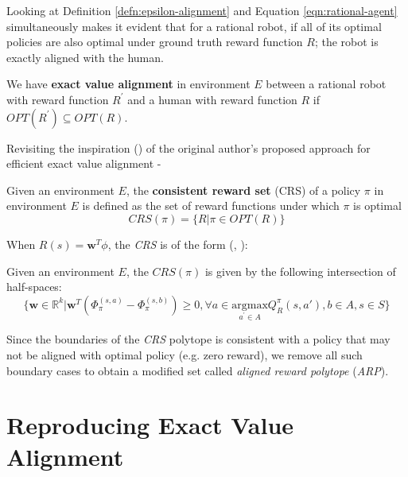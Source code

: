 Looking at Definition \ref{defn:epsilon-alignment} and Equation \ref{eqn:rational-agent} simultaneously makes it evident that for a rational robot, if all of its optimal policies are also optimal under ground truth reward function $R$; the robot is exactly aligned with the human.
\begin{corollary}
    We have \textbf{exact value alignment} in environment $E$ between a rational robot with  reward function $R^{'}$ and a human with reward function $R$ if $OPT(R^{'}) \subseteq OPT(R)$.
\end{corollary}
Revisiting the inspiration (\cite{ng2000algorithms}) of the original author's proposed approach for efficient exact value alignment - 
\begin{defn}
    Given an environment $E$, the \textbf{consistent reward set} (CRS) of a policy $\pi$ in environment $E$ is defined as the set of reward functions under which $\pi$ is optimal
    \begin{equation}
    \label{eqn:crs}
        CRS(\pi) =\{ R|\pi \in OPT(R) \}
    \end{equation}
\end{defn}
When $R(s) = \mathbf{w}^T\phi$, the \textit{CRS} is of the form (\cite{ng2000algorithms}, \cite{brown2019machine}): 
\begin{corollary}
\label{corollary:CRS}
    Given an environment $E$, the $CRS(\pi)$ is given by the following intersection of half-spaces:
    \[
        \{
            \mathbf{w} \in \mathbb{R}^k | \mathbf{w}^T(\Phi_{\pi}^{(s,a)} - \Phi_{\pi}^{(s,b)}) \geq 0, \forall a \in \underset{a^{'} \in A}{\mathrm{argmax}} Q_R^{\pi} (s,a'), b \in A, s \in S 
        \}
    \]
\end{corollary}

Since the boundaries of the \textit{CRS} polytope is consistent with a policy that may not be aligned with optimal policy (e.g. zero reward), we remove all such boundary cases to obtain a modified set called \textit{aligned reward polytope} (\textit{ARP}).

\section{Reproducing Exact Value Alignment}
\label{sec:Reproducing Exact Value Alignment}

